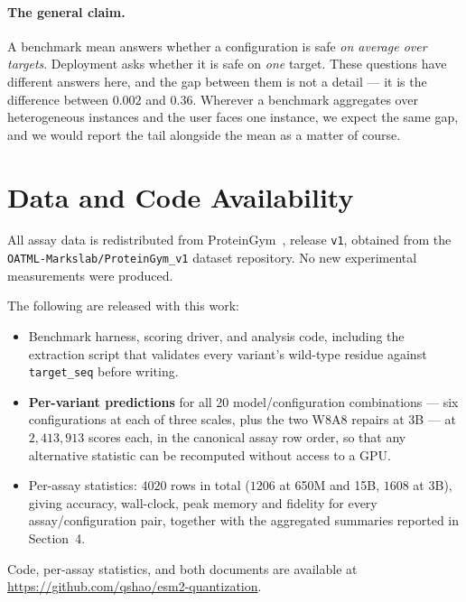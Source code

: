 \documentclass[11pt]{article}
\begin{document}
\paragraph{The general claim.} A benchmark mean answers whether a configuration
is safe \emph{on average over targets}. Deployment asks whether it is safe on
\emph{one} target. These questions have different answers here, and the gap
between them is not a detail --- it is the difference between $0.002$ and
$0.36$. Wherever a benchmark aggregates over heterogeneous instances and the
user faces one instance, we expect the same gap, and we would report the tail
alongside the mean as a matter of course.

\section{Data and Code Availability}
\label{sec:avail}

All assay data is redistributed from ProteinGym~\cite{notin2023proteingym},
release \texttt{v1}, obtained from the
\texttt{OATML-Markslab/}\allowbreak\texttt{ProteinGym\_v1} dataset repository.
No new experimental measurements were produced.

The following are released with this work:

\begin{itemize}\setlength{\itemsep}{1pt}
  \item Benchmark harness, scoring driver, and analysis code, including the
        extraction script that validates every variant's wild-type residue
        against \texttt{target\_seq} before writing.
  \item \textbf{Per-variant predictions} for all 20 model/configuration
        combinations --- six configurations at each of three scales, plus the
        two W8A8 repairs at 3B --- at $2{,}413{,}913$ scores each, in the
        canonical assay row order, so that any alternative statistic can be
        recomputed without access to a GPU.
  \item Per-assay statistics: $4020$ rows in total ($1206$ at 650M and 15B,
        $1608$ at 3B), giving accuracy, wall-clock, peak memory and fidelity for
        every assay/configuration pair, together with the aggregated summaries
        reported in Section~4.
\end{itemize}

\noindent
\noindent
Code, per-assay statistics, and both documents are available at
\url{https://github.com/qshao/esm2-quantization}.
\end{document}
